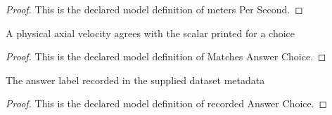 \begin{proof}
  This is the declared model definition of meters Per Second.
\end{proof}
\begin{definition}
  \label{def:physics:phyx-mini-0669:phyxminiproblems-problemphyxmini0669-matchesanswerchoice}
  A physical axial velocity agrees with the scalar printed for a choice
\end{definition}
\begin{proof}
  This is the declared model definition of Matches Answer Choice.
\end{proof}
\begin{definition}
  \label{def:physics:phyx-mini-0669:phyxminiproblems-problemphyxmini0669-recordedanswerchoice}
  The answer label recorded in the supplied dataset metadata
\end{definition}
\begin{proof}
  This is the declared model definition of recorded Answer Choice.
\end{proof}
